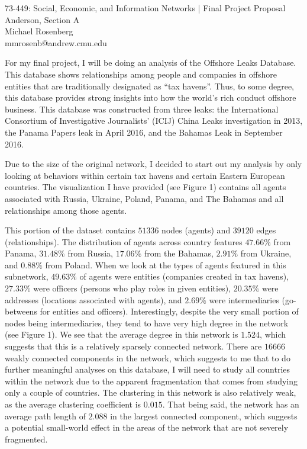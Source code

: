 \documentclass[11pt]{article}
\makeatletter
\newcommand{\myname}{Michael Rosenberg}
\newcommand{\myandrew}{mmrosenb@andrew.cmu.edu}
\newcommand{\mycourse}{73-449: Social, Economic, and Information Networks}
\newcommand{\myhwname}{| Final Project Proposal}
\newcommand{\myrecitation}{Anderson, Section A}
\newcommand{\myteammates}{}
\makeatother
\begin{document}
\begin{center}
    {\Large \mycourse} {\Large \myhwname} \\
    \myrecitation \\
    \myname \\
    \myandrew \\
\end{center}

For my final project, I will be doing an analysis of the Offshore Leaks
Database. This database shows relationships among people and
companies in offshore entities that are traditionally designated as ``tax
havens''. Thus, to some degree, this database provides strong insights into how
the world's rich conduct offshore business. This database was constructed from
three leaks: the International Consortium of Investigative Journalists' (ICIJ)
China Leaks investigation in 2013, the Panama Papers leak in April 2016, and the
Bahamas Leak in September 2016.

Due to the size of the original network, I decided to start out my analysis by
only looking at behaviors within certain tax havens and certain Eastern
European countries. The visualization I have provided (see Figure 1) contains
all agents associated with Russia, Ukraine, Poland, Panama, and The Bahamas and
all relationships among those agents.

This portion of the dataset contains $51336$ nodes (agents) and $39120$ edges
(relationships). The distribution of agents across country features $47.66\%$
from Panama, $31.48\%$ from Russia, $17.06\%$ from the Bahamas, $2.91\%$ from
Ukraine, and $0.88\%$ from Poland. When we look at the types of agents featured
in this subnetwork, $49.63\%$ of agents were entities (companies created in
tax havens), $27.33\%$ were officers
(persons who play roles in given entities), $20.35\%$ were
addresses (locations associated with agents), and $2.69\%$ were intermediaries
(go-betweens for entities and officers). Interestingly, despite the very
small portion of nodes being intermediaries, they tend to have very
high degree in the network (see Figure 1). We see that the average
degree in this network is $1.524$, which suggests that this is a relatively
sparsely connected network. There are $16666$ weakly connected components in
the network, which suggests to me that to do further meaningful analyses on
this database, I will need to study all countries within the network due to the
apparent fragmentation that comes from studying only a couple of countries.
The clustering in this network is also relatively weak, as the average
clustering coefficient is $0.015.$ That being said, the network has an
average path length of $2.088$ in the largest connected component, which
suggests a potential small-world effect in the areas of the network that are
not severely fragmented.
\end{document}
